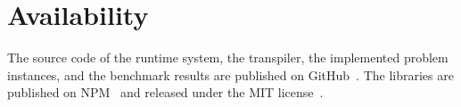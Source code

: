 \section{Availability}
The source code of the runtime system, the transpiler, the implemented problem instances, and the benchmark results are published on GitHub~\cite{parallelEs, parallelEsBabel, parallelEsWebpack, parallelEsExample}. The libraries are published on NPM~\cite{npm} and released under the MIT license~\cite{mit}.
